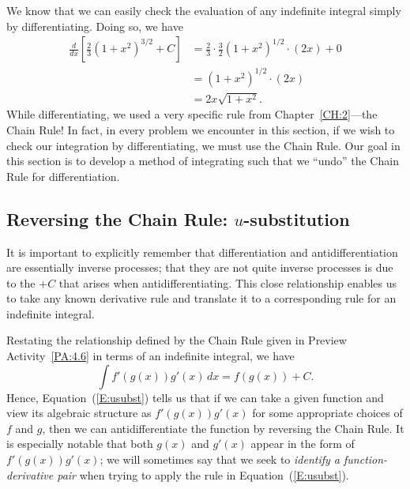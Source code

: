 We know that we can easily check the evaluation of any indefinite integral simply by differentiating.  Doing so, we have
\begin{align*}
\frac{d}{dx}\left[ \frac{2}{3}\left( 1 + x^2 \right)^{3/2} + C \right] & = \frac{2}{3} \cdot \frac{3}{2} \left( 1 + x^2 \right)^{1/2} \cdot (2x) + 0 \\
& = \left( 1 + x^2 \right)^{1/2} \cdot (2x) \\
& = 2x \sqrt{1 + x^2}.
\end{align*}
While differentiating, we used a very specific rule from Chapter~\ref{CH:2}---the Chain Rule!  In fact, in every problem we encounter in this section, if we wish to check our integration by differentiating, we must use the Chain Rule.  Our goal in this section is to develop a method of integrating such that we ``undo'' the Chain Rule for differentiation.


\subsection*{Reversing the Chain Rule: $u$-substitution} 

It is important to explicitly remember that differentiation and antidifferentiation are essentially inverse processes; that they are not quite inverse processes is due to the $+C$ that arises when antidifferentiating.  This close relationship enables us to take any known derivative rule and translate it to a corresponding rule for an indefinite integral.  

Restating the relationship defined by the Chain Rule given in Preview Activity~\ref{PA:4.6} in terms of an indefinite integral, we have
\begin{equation} \label{E:usubst} %
\int f'(g(x)) g'(x) \, dx = f(g(x))+C.
\end{equation}
Hence, Equation~(\ref{E:usubst}) tells us that if we can take a given function and view its algebraic structure as $f'(g(x)) g'(x)$ for some appropriate choices of $f$ and $g$, then we can antidifferentiate the function by reversing the Chain Rule.  It is especially notable that both $g(x)$ and $g'(x)$ appear in the form of $f'(g(x)) g'(x)$; we will sometimes say that we seek to \emph{identify a function-derivative pair} when trying to apply the rule in Equation~(\ref{E:usubst}).

